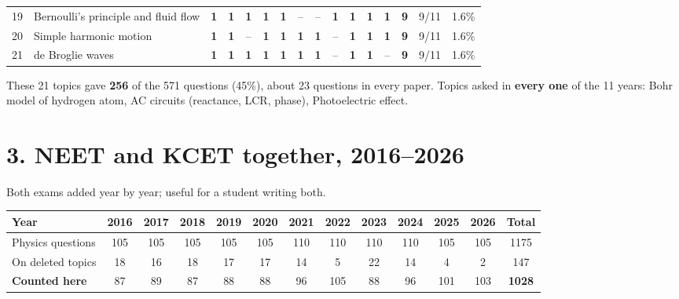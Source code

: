 \documentclass[10pt,a4paper]{article}
\begin{document}
{\begin{tabularx}{\linewidth}{@{}r>{\raggedright\arraybackslash}X*{11}{c}ccc@{}}
19 & Bernoulli's principle and fluid flow & \textbf{1} & \textbf{1} & \textbf{1} & \textbf{1} & \textbf{1} & {\color{gray!60}--} & {\color{gray!60}--} & \textbf{1} & \textbf{1} & \textbf{1} & \textbf{1} & \textbf{9} & 9/11 & 1.6\%\\
20 & Simple harmonic motion & \textbf{1} & \textbf{1} & {\color{gray!60}--} & \textbf{1} & \textbf{1} & \textbf{1} & \textbf{1} & {\color{gray!60}--} & \textbf{1} & \textbf{1} & \textbf{1} & \textbf{9} & 9/11 & 1.6\%\\
21 & de Broglie waves & \textbf{1} & \textbf{1} & \textbf{1} & \textbf{1} & \textbf{1} & \textbf{1} & \textbf{1} & {\color{gray!60}--} & \textbf{1} & \textbf{1} & {\color{gray!60}--} & \textbf{9} & 9/11 & 1.6\%\\
\bottomrule\end{tabularx}}\par\smallskip
{\small These 21 topics gave \textbf{256} of the 571 questions (45\%), about 23 questions in every paper.
Topics asked in \textbf{every one} of the 11 years: Bohr model of hydrogen atom, AC circuits (reactance, LCR, phase), Photoelectric effect.}

\clearpage
\section*{3. NEET and KCET together, 2016--2026}
{\small Both exams added year by year; useful for a student writing both.}\par\medskip
\begin{tabular*}{\linewidth}{@{\extracolsep{\fill}}l*{11}{c}c@{}}\toprule
Year & 2016 & 2017 & 2018 & 2019 & 2020 & 2021 & 2022 & 2023 & 2024 & 2025 & 2026 & Total\\\midrule
Physics questions & 105 & 105 & 105 & 105 & 105 & 110 & 110 & 110 & 110 & 105 & 105 & 1175\\
On deleted topics & 18 & 16 & 18 & 17 & 17 & 14 & 5 & 22 & 14 & 4 & 2 & 147\\
\textbf{Counted here} & 87 & 89 & 87 & 88 & 88 & 96 & 105 & 88 & 96 & 101 & 103 & \textbf{1028}\\\bottomrule\end{tabular*}\par\bigskip
\end{document}

